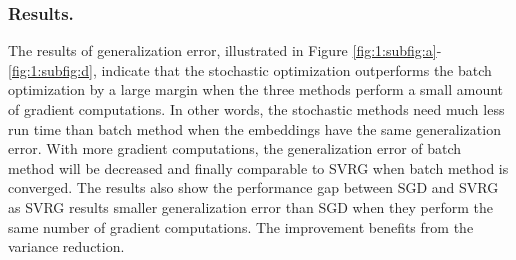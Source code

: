 \documentclass[letterpaper]{article}
\begin{document}
		\subsubsection{Results.}
		The results of generalization error, illustrated in Figure \ref{fig:1:subfig:a}-\ref{fig:1:subfig:d}, indicate that the stochastic optimization outperforms the batch optimization by a large margin when the three methods perform a small amount of gradient computations. In other words, the stochastic methods need much less run time than batch method when the embeddings have the same generalization error. With more gradient computations, the generalization error of batch method will be decreased and finally comparable to SVRG when batch method is converged. The results also show the performance gap between SGD and SVRG as SVRG results smaller generalization error than SGD when they perform the same number of gradient computations. The improvement benefits from the variance reduction. 

\end{document}
